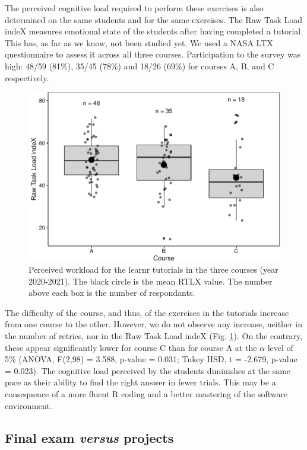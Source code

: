\documentclass{aims}
\theoremstyle{definition}
\begin{document}
The perceived cognitive load required to perform these exercises is also
determined on the same students and for the same exercises. The Raw Task
Load indeX measures emotional state of the students after having
completed a tutorial. This has, as far as we know, not been studied yet.
We used a NASA LTX questionnaire to assess it across all three courses.
Participation to the survey was high: 48/59 (81\%), 35/45 (78\%) and
18/26 (69\%) for courses A, B, and C respectively.

\begin{figure}
\includegraphics[width=1\linewidth]{teaching_data_science_files/figure-latex/fig_rtlx-1} \caption{\label{fig:fig_rtlx} Perceived workload for the learnr tutorials in the three courses (year 2020-2021). The black circle is the mean RTLX value. The number above each box is the number of respondants.}\label{fig:fig_rtlx}
\end{figure}

The difficulty of the course, and thus, of the exercises in the
tutorials increase from one course to the other. However, we do not
observe any increase, neither in the number of retries, nor in the Raw
Task Load indeX (Fig. \ref {fig:fig_rtlx}). On the contrary, these
appear significantly lower for course C than for course A at the
\(\alpha\) level of 5\% (ANOVA, F(2,98) = 3.588, p-value = 0.031; Tukey
HSD, t = -2.679, p-value = 0.023). The cognitive load perceived by the
students diminishes at the same pace as their ability to find the right
answer in fewer trials. This may be a consequence of a more fluent R
coding and a better mastering of the software environment.

\hypertarget{final-exam-versus-projects}{%
\subsection{\texorpdfstring{Final exam \emph{versus}
projects}{Final exam versus projects}}\label{final-exam-versus-projects}}
\end{document}
